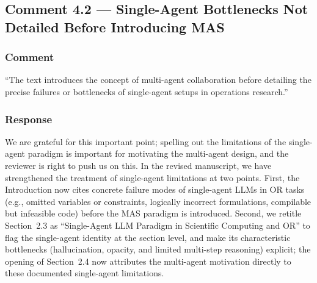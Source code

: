 \documentclass[11pt,a4paper]{article}
\begin{document}
\subsection{Comment 4.2 --- Single-Agent Bottlenecks Not Detailed Before Introducing MAS}

\subsubsection{Comment}
``The text introduces the concept of multi-agent collaboration before detailing the precise failures or bottlenecks of single-agent setups in operations research.''

\subsubsection{Response}
We are grateful for this important point; spelling out the limitations of the single-agent paradigm is important for motivating the multi-agent design, and the reviewer is right to push us on this. In the revised manuscript, we have strengthened the treatment of single-agent limitations at two points. First, the Introduction now cites concrete failure modes of single-agent LLMs in OR tasks (e.g., omitted variables or constraints, logically incorrect formulations, compilable but infeasible code) before the MAS paradigm is introduced. Second, we retitle Section~2.3 as ``Single-Agent LLM Paradigm in Scientific Computing and OR'' to flag the single-agent identity at the section level, and make its characteristic bottlenecks (hallucination, opacity, and limited multi-step reasoning) explicit; the opening of Section~2.4 now attributes the multi-agent motivation directly to these documented single-agent limitations.
\end{document}
